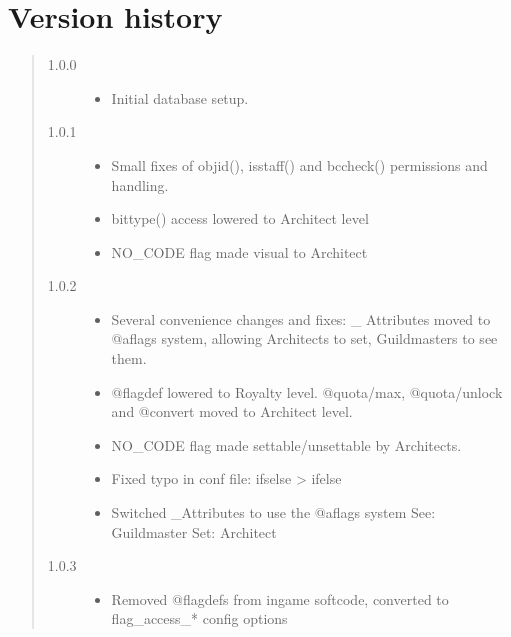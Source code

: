 \documentclass[letterpaper,10pt,english]{sphinxmanual}
\begin{document}
\section{Version history}
\label{\detokenize{ambrosiadb:version-history}}\begin{quote}
\begin{description}
\item[{1.0.0}] \leavevmode\begin{itemize}
\item {} 
\sphinxAtStartPar
Initial database setup.

\end{itemize}

\item[{1.0.1}] \leavevmode\begin{itemize}
\item {} 
\sphinxAtStartPar
Small fixes of objid(), isstaff() and bccheck() permissions and handling.

\item {} 
\sphinxAtStartPar
bittype() access lowered to Architect level

\item {} 
\sphinxAtStartPar
NO\_CODE flag made visual to Architect

\end{itemize}

\item[{1.0.2}] \leavevmode\begin{itemize}
\item {} 
\sphinxAtStartPar
Several convenience changes and fixes: \_ Attributes moved to @aflags
system, allowing Architects to set, Guildmasters to see them.

\item {} 
\sphinxAtStartPar
@flagdef lowered to Royalty level. @quota/max, @quota/unlock and @convert
moved to Architect level.

\item {} 
\sphinxAtStartPar
NO\_CODE flag made settable/unsettable by Architects.

\item {} 
\sphinxAtStartPar
Fixed typo in conf file: ifselse \sphinxhyphen{}\textgreater{} ifelse

\item {} 
\sphinxAtStartPar
Switched \_Attributes to use the @aflags system
See: Guildmaster
Set: Architect

\end{itemize}

\item[{1.0.3}] \leavevmode\begin{itemize}
\item {} 
\sphinxAtStartPar
Removed @flagdefs from in\sphinxhyphen{}game softcode, converted to flag\_access\_*
config options


\end{itemize}
\end{description}
\end{quote}
\end{document}
